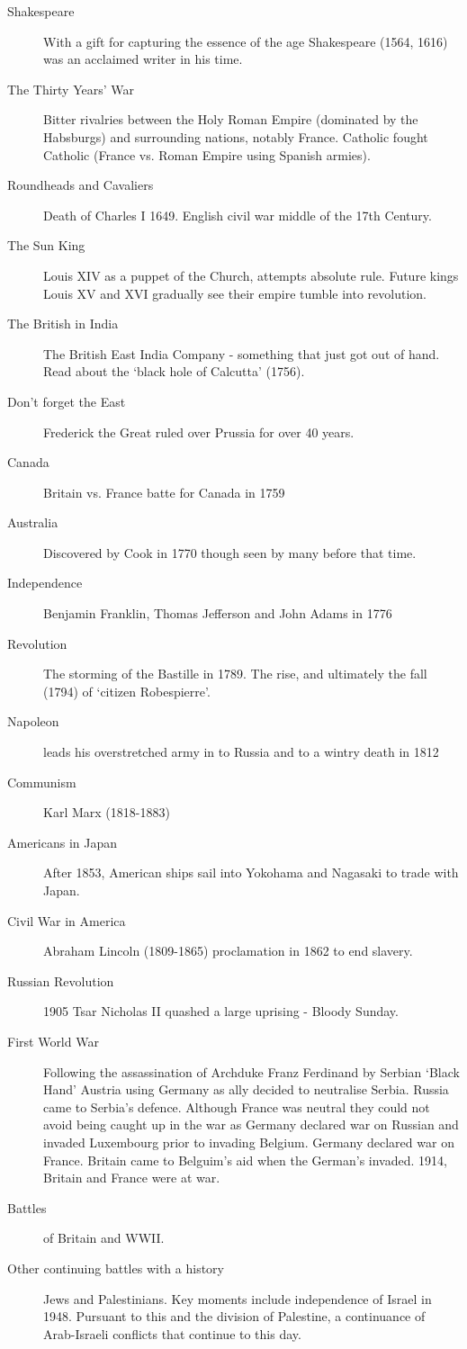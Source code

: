 \begin{description}
\item [Shakespeare] With a gift for capturing the essence of the age Shakespeare (1564, 1616) was an acclaimed writer in his time.
\item [The Thirty Years' War] Bitter rivalries between the Holy Roman Empire (dominated by the Habsburgs) and surrounding nations, notably France. Catholic fought Catholic (France vs. Roman Empire using Spanish armies). 
\item [Roundheads and Cavaliers] Death of Charles I 1649. English civil war middle of the 17th Century. 
\item [The Sun King] Louis XIV as a puppet of the Church, attempts absolute rule. Future kings Louis XV and XVI gradually see their empire tumble into revolution. 
\item [The British in India] The British East India Company - something that just got out of hand. Read about the `black hole of Calcutta' (1756).
\item [Don't forget the East] Frederick the Great ruled over Prussia for over 40 years. 
\item [Canada] Britain vs. France batte for Canada in 1759
\item [Australia] Discovered by Cook in 1770 though seen by many before that time. 
\item [Independence] Benjamin Franklin, Thomas Jefferson and John Adams in 1776
\item [Revolution] The storming of the Bastille in 1789. The rise, and ultimately the fall (1794) of `citizen Robespierre'. 
\item [Napoleon] leads his overstretched army in to Russia and to a wintry death in 1812
\item [Communism] Karl Marx (1818-1883)
\item [Americans in Japan] After 1853, American ships sail into Yokohama and Nagasaki to trade with Japan. 
\item [Civil War in America] Abraham Lincoln (1809-1865) proclamation in 1862 to end slavery. 
\item [Russian Revolution] 1905 Tsar Nicholas II quashed a large uprising - Bloody Sunday. 
\item [First World War] Following the assassination of Archduke Franz Ferdinand by Serbian `Black Hand' Austria using Germany as ally decided to neutralise Serbia. Russia came to Serbia's defence. Although France was neutral they could not avoid being caught up in the war as Germany declared war on Russian and invaded Luxembourg prior to invading Belgium. Germany declared war on France. Britain came to Belguim's aid when the German's invaded. 1914, Britain and France were at war. 
\item [Battles] of Britain and WWII. 
\item [Other continuing battles with a history] Jews and Palestinians. Key moments include independence of Israel in 1948. Pursuant to this and the division of Palestine, a continuance of Arab-Israeli conflicts that continue to this day.    

\end{description}



